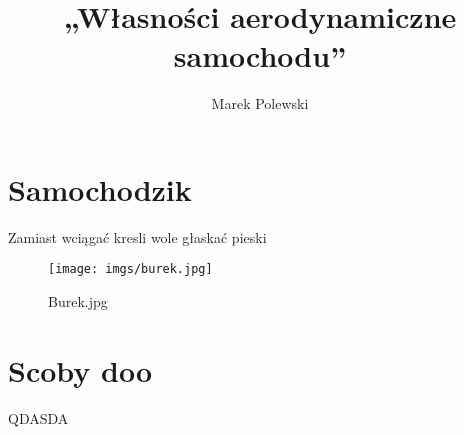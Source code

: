 \documentclass[12pt]{sprawozdanie}
\title{„Własności aerodynamiczne samochodu”}
\author{Marek Polewski}
\begin{document}
\maketitle

\leavevmode\thispagestyle{empty}
\newpage


\tableofcontents

\FloatBarrier
\setcounter{page}{1}


\section{Samochodzik}

Zamiast wciągać kresli wole głaskać pieski

\begin{figure}[h!]
    \centering
    \texttt{[image: imgs/burek.jpg]}
    \caption{Burek.jpg}
    \label{fig:burek}
\end{figure}
\FloatBarrier


\section{Scoby doo}
QDASDA
\end{document}
